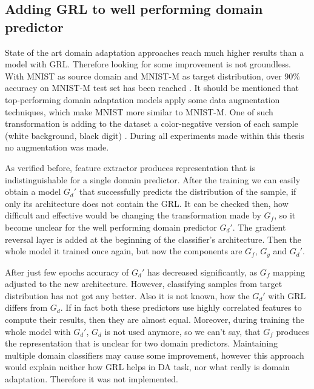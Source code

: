 \documentclass{article}
\begin{document}
\subsection{Adding GRL to well performing domain predictor}
State of the art domain adaptation approaches reach much higher results than a model with GRL. Therefore looking for some improvement is not groundless. With MNIST as source domain and MNIST-M as target distribution, over 90\% accuracy on MNIST-M test set has been reached \cite{dida}. It should be mentioned that top-performing domain adaptation models apply some data augmentation techniques, which make MNIST more similar to MNIST-M. One of such transformation is adding to the dataset a color-negative version of each sample (white background, black digit) \cite{augm}. During all experiments made within this thesis no augmentation was made.
\par
As verified before, feature extractor produces representation that is indistinguishable for a single domain predictor. After the training we can easily obtain a model $G_{d}'$ that successfully predicts the distribution of the sample, if only its architecture does not contain the GRL. It can be checked then, how difficult and effective would be changing the transformation made by $G_{f}$, so it become unclear for the well performing domain predictor $G_{d}'$. The gradient reversal layer is added at the beginning of the classifier's architecture. Then the whole model it trained once again, but now the components are $G_{f}$, $G_{y}$ and $G_{d}'$. 
\par
After just few epochs accuracy of $G_{d}'$ has decreased significantly, as $G_{f}$ mapping adjusted to the new architecture. However, classifying samples from target distribution has not got any better. Also it is not known, how the $G_{d}'$ with GRL differs from $G_{d}$. If in fact both these predictors use highly correlated features to compute their results, then they are almost equal. Moreover, during training the whole model with $G_{d}'$, $G_{d}$ is not used anymore, so we can't say, that $G_{f}$ produces the representation that is unclear for two domain predictors. Maintaining multiple domain classifiers may cause some improvement, however this approach would explain neither how GRL helps in DA task, nor what really is domain adaptation. Therefore it was not implemented.
\end{document}
